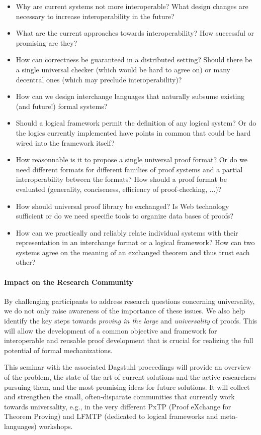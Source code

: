 \begin{itemize}
\item Why are current systems not more interoperable? What design changes are necessary to increase interoperability in the future?
\item What are the current approaches towards interoperability? How successful or promising are they?
\item How can correctness be guaranteed in a distributed setting?
 Should there be a single universal checker (which would be hard to agree on) or many decentral ones (which may preclude interoperability)?
\item How can we design interchange languages that naturally subsume
  existing (and future!) formal systems?
\item Should a logical framework permit the definition of any logical system?
Or do the logics currently implemented have points in common that could
be hard wired into the framework itself?
\item How reasonnable is it to propose a single universal proof format?
Or do we need different formats for different families of
proof systems and a partial interoperability between the formats?
 How should a proof format be evaluated (generality, conciseness,
efficiency of proof-checking, ...)?
\item How should universal proof library be exchanged? Is Web technology
sufficient or do we need specific tools to organize data bases of
proofs?
\item How can we practically and reliably relate individual systems with their representation in an interchange format or a logical framework?
How can two systems agree on the meaning of an exchanged theorem and thus trust each other?
\end{itemize}

\paragraph{Impact on the Research Community}
By challenging participants to address research questions concerning
universality, we do not only raise awareness of the importance of these issues.
We also help identify the key steps towards \emph{proving in the large} and
\emph{universality} of proofs. This will allow the development of a common
objective and framework for interoperable and reusable proof development that is
crucial for realizing the full potential of formal mechanizations.

This seminar with the associated Dagstuhl proceedings will provide an overview
of the problem, the state of the art of current solutions and the active
researchers pursuing them, and the most promising ideas for future solutions. It
will collect and strengthen the small, often-disparate communities that
currently work towards universality, e.g., in the very different PxTP (Proof
eXchange for Theorem Proving) and LFMTP (dedicated to logical frameworks and
meta-languages) workshops.

